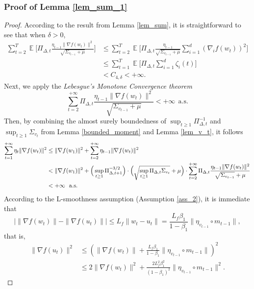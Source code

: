 \documentclass{article} %
\DeclareMathOperator{\Expect}{\mathbb{E}}
\begin{document}
\subsubsection{Proof of Lemma \ref{lem_sum_1}}
\begin{proof}
According to the result from Lemma \ref{lem_sum}, it is straightforward to see that when $\delta > 0$,
\begin{align*}
  \sum_{t=2}^{T}\Expect\bigg[\Pi_{\Delta,t}\frac{\eta_{t-1}\|\nabla f(w_{t})\|^{2}}{\sqrt{\Sigma_{v_{t-1}}+\mu}}\bigg]&\le \sum_{t=2}^{T}\Expect\bigg[\Pi_{\Delta,t}\frac{\eta_{t-1}}{\sqrt{\Sigma_{v_{t-1}}+\mu}}\sum_{i=1}^{d}(\nabla_{i}f(w_{t}))^{2}\bigg]\\&\le \sum_{t=1}^{T}\Expect\bigg[\Pi_{\Delta,t}\sum_{i=1}^{d}\zeta_{i}(t)\bigg]\\&<C_{4,\delta}<+\infty.
\end{align*}
Next, we apply the \emph{Lebesgue's Monotone Convergence theorem}
\[\sum_{t=2}^{+\infty}{\Pi_{\Delta,t}}\frac{\eta_{t-1}\|\nabla f(w_{t})\|^{2}}{\sqrt{\Sigma_{v_{t-1}}+\mu}}<+\infty\ \ \text{a.s.}\]
Then, by combining the almost surely boundedness of $\sup_{t\ge 1}\Pi^{-1}_{\Delta,t}$ and ${\sup_{t\ge 1}\Sigma_{v_{t}}}$ from Lemma \ref{bounded_moment} and Lemma \ref{lem_v_t}, it follows
\begin{align*}
\sum_{t=1}^{+\infty}\eta_{t}\|\nabla f(w_{t})\|^{2}&\le \|\nabla f(w_{1})\|^{2}+\sum_{t=2}^{+\infty}\eta_{t-1}\|\nabla f(w_{t})\|^{2}\\&<\|\nabla f(w_{1})\|^{2}+\Big(\sup_{t\ge 1}\Pi^{-3/2}_{\Delta,t+1}\Big)\cdot\Big(\sqrt{\sup_{t\ge 1}\Pi_{\Delta,t}\Sigma_{v_{t}}}+\mu\Big)\cdot\sum_{t=2}^{+\infty}\Pi_{\Delta,t}\frac{\eta_{t-1}\|\nabla f(w_{t})\|^{2}}{\sqrt{\Sigma_{v_{t-1}}}+\mu}\\&<+\infty\ \ \text{\text{a.s.}}
\end{align*}
According to the L-smoothness assumption (Assumption \ref{ass_2}), it is immediate that
\[
|\|\nabla f(w_{t})\| - \|\nabla f(u_{t})\| |\leq L_{f} \|w_{t} - u_{t}\| = \frac{L_{f} \beta_{1}}{1 - \beta_{1}} \|\eta_{v_{t-1}} \circ m_{t-1}\|,\]%
that is,
\begin{align*}
 \|\nabla f(u_{t})\|^{2}&\le\left(\|\nabla f(w_{t})\|+\frac{L_{f} \beta_{1}}{1 - \beta_{1}} \|\eta_{v_{t-1}} \circ m_{t-1}\|\right)^{2}\\&\le 2\|\nabla f(w_{t})\|^{2}+\frac{2L_{f}^{2}\beta_{1}^{2}}{(1-\beta_{1})^{2}} \|\eta_{v_{t-1}} \circ m_{t-1}\|^{2}.
\end{align*}

\end{proof}
\end{document}
